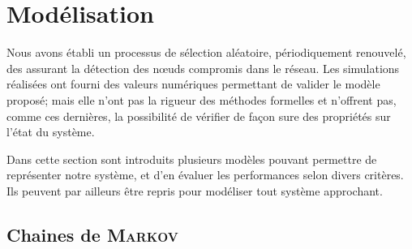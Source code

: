\section{Modélisation}
\label{sa:sec:modelisation}

Nous avons établi un processus de sélection aléatoire, périodiquement renouvelé, des \cns assurant la détection des nœuds compromis dans le réseau.
Les simulations réalisées ont fourni des valeurs numériques permettant de valider le modèle proposé; mais elle n'ont pas la rigueur des méthodes formelles et n'offrent pas, comme ces dernières, la possibilité de vérifier de façon sure des propriétés sur l'état du système.

Dans cette section sont introduits plusieurs modèles pouvant permettre de représenter notre système, et d'en évaluer les performances selon divers critères.
Ils peuvent par ailleurs être repris pour modéliser tout système approchant.

    \subsection{Chaines de \textsc{Markov}}

